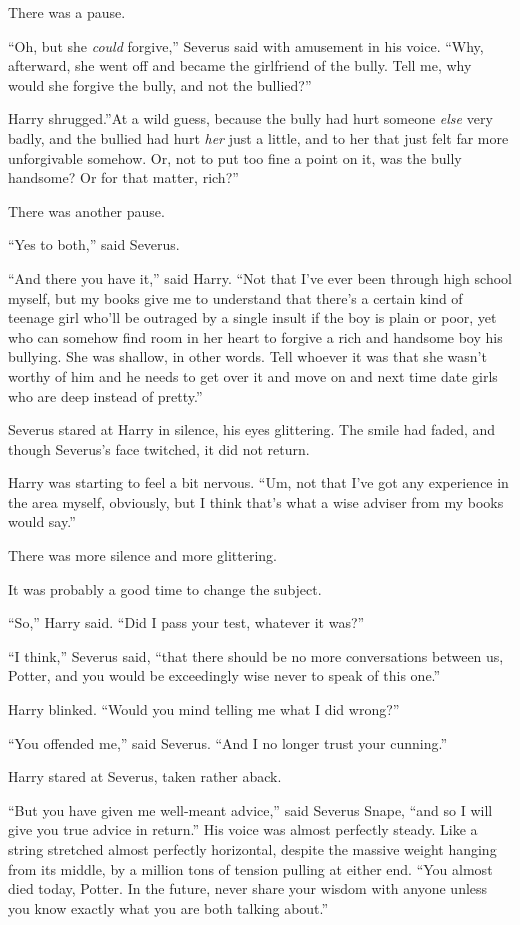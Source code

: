There was a pause.

``Oh, but she \emph{could} forgive,'' Severus said with amusement in his
voice. ``Why, afterward, she went off and became the girlfriend of the
bully. Tell me, why would she forgive the bully, and not the bullied?''

Harry shrugged.''At a wild guess, because the bully had hurt someone
\emph{else} very badly, and the bullied had hurt \emph{her} just a
little, and to her that just felt far more unforgivable somehow. Or, not
to put too fine a point on it, was the bully handsome? Or for that
matter, rich?''

There was another pause.

``Yes to both,'' said Severus.

``And there you have it,'' said Harry. ``Not that I've ever been through
high school myself, but my books give me to understand that there's a
certain kind of teenage girl who'll be outraged by a single insult if
the boy is plain or poor, yet who can somehow find room in her heart to
forgive a rich and handsome boy his bullying. She was shallow, in other
words. Tell whoever it was that she wasn't worthy of him and he needs to
get over it and move on and next time date girls who are deep instead of
pretty.''

Severus stared at Harry in silence, his eyes glittering. The smile had
faded, and though Severus's face twitched, it did not return.

Harry was starting to feel a bit nervous. ``Um, not that I've got any
experience in the area myself, obviously, but I think that's what a wise
adviser from my books would say.''

There was more silence and more glittering.

It was probably a good time to change the subject.

``So,'' Harry said. ``Did I pass your test, whatever it was?''

``I think,'' Severus said, ``that there should be no more conversations
between us, Potter, and you would be exceedingly wise never to speak of
this one.''

Harry blinked. ``Would you mind telling me what I did wrong?''

``You offended me,'' said Severus. ``And I no longer trust your
cunning.''

Harry stared at Severus, taken rather aback.

``But you have given me well-meant advice,'' said Severus Snape, ``and
so I will give you true advice in return.'' His voice was almost
perfectly steady. Like a string stretched almost perfectly horizontal,
despite the massive weight hanging from its middle, by a million tons of
tension pulling at either end. ``You almost died today, Potter. In the
future, never share your wisdom with anyone unless you know exactly what
you are both talking about.''

